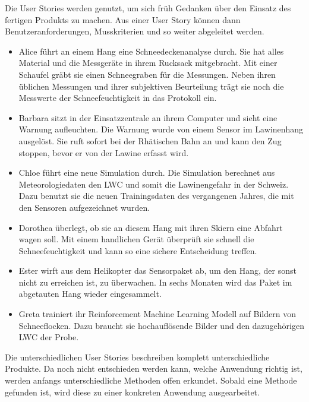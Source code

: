 

Die User Stories werden genutzt, um sich früh Gedanken über den Einsatz des fertigen Produkts zu machen. Aus einer User Story können dann Benutzeranforderungen, Musskriterien und so weiter abgeleitet werden.

\begin{itemize}

\item Alice führt an einem Hang eine Schneedeckenanalyse durch. Sie hat alles Material und die Messgeräte in ihrem Rucksack mitgebracht. Mit einer Schaufel gräbt sie einen Schneegraben für die Messungen. Neben ihren üblichen Messungen und ihrer subjektiven Beurteilung trägt sie noch die Messwerte der Schneefeuchtigkeit in das Protokoll ein.

\item Barbara sitzt in der Einsatzzentrale an ihrem Computer und sieht eine Warnung aufleuchten. Die Warnung wurde von einem Sensor im Lawinenhang ausgelöst. Sie ruft sofort bei der Rhätischen Bahn an und kann den Zug stoppen, bevor er von der Lawine erfasst wird.

\item Chloe führt eine neue Simulation durch. Die Simulation berechnet aus Meteorologiedaten den LWC und somit die Lawinengefahr in der Schweiz. Dazu benutzt sie die neuen Trainingsdaten des vergangenen Jahres, die mit den Sensoren aufgezeichnet wurden.

\item Dorothea überlegt, ob sie an diesem Hang mit ihren Skiern eine Abfahrt wagen soll. Mit einem handlichen Gerät überprüft sie schnell die Schneefeuchtigkeit und kann so eine sichere Entscheidung treffen.

\item Ester wirft aus dem Helikopter das Sensorpaket ab, um den Hang, der sonst nicht zu erreichen ist, zu überwachen. In sechs Monaten wird das Paket im abgetauten Hang wieder eingesammelt.

\item Greta trainiert ihr Reinforcement Machine Learning Modell auf Bildern von Schneeflocken. Dazu braucht sie hochauflösende Bilder und den dazugehörigen LWC der Probe.

\end{itemize}

Die unterschiedlichen User Stories beschreiben komplett unterschiedliche Produkte. Da noch nicht entschieden werden kann, welche Anwendung richtig ist, werden anfangs unterschiedliche Methoden offen erkundet. Sobald eine Methode gefunden ist, wird diese zu einer konkreten Anwendung ausgearbeitet.

